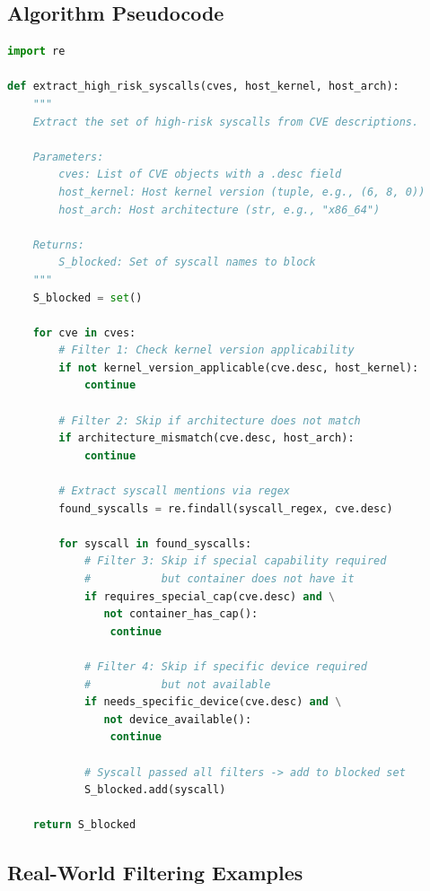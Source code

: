 \subsection{Algorithm Pseudocode}
\label{subsec:appendix_pseudocode}

\begin{lstlisting}[float=htbp, language=Python, caption={Rule-based CVE parser: syscall extraction algorithm.}]
import re

def extract_high_risk_syscalls(cves, host_kernel, host_arch):
    """
    Extract the set of high-risk syscalls from CVE descriptions.

    Parameters:
        cves: List of CVE objects with a .desc field
        host_kernel: Host kernel version (tuple, e.g., (6, 8, 0))
        host_arch: Host architecture (str, e.g., "x86_64")

    Returns:
        S_blocked: Set of syscall names to block
    """
    S_blocked = set()

    for cve in cves:
        # Filter 1: Check kernel version applicability
        if not kernel_version_applicable(cve.desc, host_kernel):
            continue

        # Filter 2: Skip if architecture does not match
        if architecture_mismatch(cve.desc, host_arch):
            continue

        # Extract syscall mentions via regex
        found_syscalls = re.findall(syscall_regex, cve.desc)

        for syscall in found_syscalls:
            # Filter 3: Skip if special capability required
            #           but container does not have it
            if requires_special_cap(cve.desc) and \
               not container_has_cap():
                continue

            # Filter 4: Skip if specific device required
            #           but not available
            if needs_specific_device(cve.desc) and \
               not device_available():
                continue

            # Syscall passed all filters -> add to blocked set
            S_blocked.add(syscall)

    return S_blocked
\end{lstlisting}

\subsection{Real-World Filtering Examples}
\label{subsec:appendix_examples}

